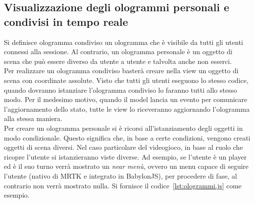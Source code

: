 \subsection{Visualizzazione degli ologrammi personali e condivisi in tempo reale}
Si definisce ologramma condiviso un ologramma che è visibile da tutti gli utenti connessi alla sessione. Al contrario, un ologramma personale è un oggetto di scena che può essere diverso
da utente a utente e talvolta anche non esserci.\\
Per realizzare un ologramma condiviso basterà creare nella view un oggetto di scena con coordinate assolute. Visto che tutti gli utenti eseguono lo stesso codice, quando
dovranno istanziare l'ologramma condiviso lo faranno tutti allo stesso modo. Per il medesimo motivo, quando il model lancia un evento per comunicare l'aggiornamento dello stato, tutte le 
view lo riceveranno aggiornando l'ologramma alla stessa maniera.\\
Per creare un ologramma personale si è ricorsi all'istanziamento degli oggetti in modo condizionale. Questo significa che, in base a certe condizioni, vengono creati oggetti di scena 
diversi. Nel caso particolare del videogioco, in base al ruolo che ricopre l'utente si istanzieranno viste diverse. Ad esempio, se l'utente è un player ed è il suo turno verrà mostrato un
\textit{near menù}, ovvero un menu capace di seguire l'utente (nativo di MRTK e integrato in BabylonJS), per procedere di fase, al contrario non verrà mostrato nulla. Si fornisce il 
codice~\ref{lst:ologrammi.js} come esempio. 



